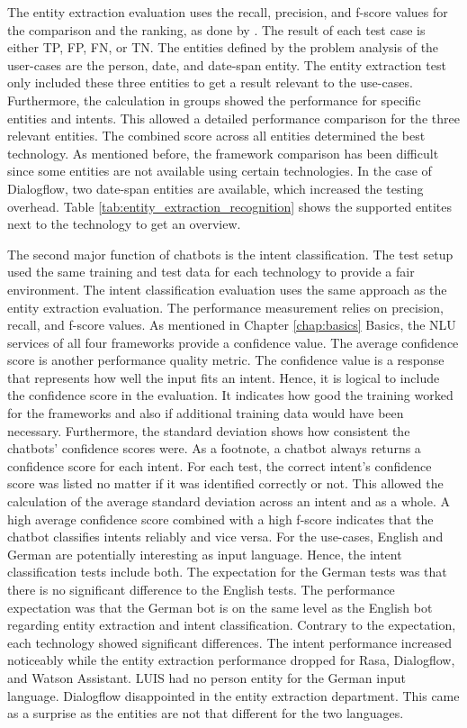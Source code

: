 The entity extraction evaluation uses the recall, precision, and f-score values for the comparison and the ranking, as done by \citet{braunEvaluatingNLU}.
The result of each test case is either TP, FP, FN, or TN.
The entities defined by the problem analysis of the user-cases are the person, date, and date-span entity.
The entity extraction test only included these three entities to get a result relevant to the use-cases.
Furthermore, the calculation in groups showed the performance for specific entities and intents. 
This allowed a detailed performance comparison for the three relevant entities.
The combined score across all entities determined the best technology.
As mentioned before, the framework comparison has been difficult since some entities are not available using certain technologies.
In the case of Dialogflow, two date-span entities are available, which increased the testing overhead.
Table \ref{tab:entity_extraction_recognition} shows the supported entites next to the technology to get an overview.

The second major function of chatbots is the intent classification.
The test setup used the same training and test data for each technology to provide a fair environment.
The intent classification evaluation uses the same approach as the entity extraction evaluation.
The performance measurement relies on precision, recall, and f-score values.
As mentioned in Chapter \ref{chap:basics} Basics, the NLU services of all four frameworks provide a confidence value.
The average confidence score is another performance quality metric.
The confidence value is a response that represents how well the input fits an intent.
Hence, it is logical to include the confidence score in the evaluation.
It indicates how good the training worked for the frameworks and also if additional training data would have been necessary.
Furthermore, the standard deviation shows how consistent the chatbots' confidence scores were. 
As a footnote, a chatbot always returns a confidence score for each intent.
For each test, the correct intent's confidence score was listed no matter if it was identified correctly or not.
This allowed the calculation of the average standard deviation across an intent and as a whole.
A high average confidence score combined with a high f-score indicates that the chatbot classifies intents reliably and vice versa.
For the use-cases, English and German are potentially interesting as input language.
Hence, the intent classification tests include both.
The expectation for the German tests was that there is no significant difference to the English tests.
The performance expectation was that the German bot is on the same level as the English bot regarding entity extraction and intent classification.
Contrary to the expectation, each technology showed significant differences.
The intent performance increased noticeably while the entity extraction performance dropped for Rasa, Dialogflow, and Watson Assistant.
LUIS had no person entity for the German input language.
Dialogflow disappointed in the entity extraction department.
This came as a surprise as the entities are not that different for the two languages.
 
